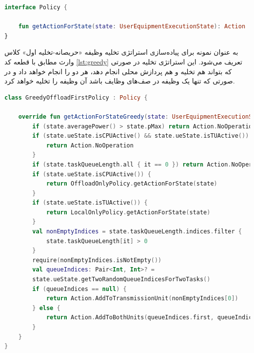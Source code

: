 \begin{LTR}
	\begin{lstlisting}[language=Kotlin, caption={واسط \lr{Policy}}, captiondirection=RTL, label={lst:policy}]
interface Policy {
	
	fun getActionForState(state: UserEquipmentExecutionState): Action
}
	\end{lstlisting}
\end{LTR}
به عنوان نمونه برای پیاده‌سازی استراتژی تخلیه وظیفه «حریصانه-تخلیه اول» کلاس وارث مطابق با قطعه کد \ref{lst:greedy} تعریف می‌شود. این استراتژی تخلیه در صورتی که بتواند هم تخلیه و هم پردازش محلی انجام دهد، هر دو را انجام خواهد داد و در صورتی که تنها یک وظیفه در صف‌های وظایف باشد آن وظیفه را تخلیه خواهد کرد.
\begin{LTR}
	\begin{lstlisting}[language=Kotlin, caption={پیاده‌سازی استراتژی تخلیه وظیفه حریصانه-تخلیه اول}, captiondirection=RTL, label={lst:greedy}]
class GreedyOffloadFirstPolicy : Policy {
	
	override fun getActionForStateGreedy(state: UserEquipmentExecutionState): Action {
		if (state.averagePower() > state.pMax) return Action.NoOperation
		if (state.ueState.isCPUActive() && state.ueState.isTUActive()) {
			return Action.NoOperation
		}
		if (state.taskQueueLength.all { it == 0 }) return Action.NoOperation
		if (state.ueState.isCPUActive()) {
			return OffloadOnlyPolicy.getActionForState(state)
		}
		if (state.ueState.isTUActive()) {
			return LocalOnlyPolicy.getActionForState(state)
		}
		val nonEmptyIndices = state.taskQueueLength.indices.filter {
			state.taskQueueLength[it] > 0
		}
		require(nonEmptyIndices.isNotEmpty())
		val queueIndices: Pair<Int, Int>? = 
		state.ueState.getTwoRandomQueueIndicesForTwoTasks()
		if (queueIndices == null) {
			return Action.AddToTransmissionUnit(nonEmptyIndices[0])
		} else {
			return Action.AddToBothUnits(queueIndices.first, queueIndices.second)
		}
	}
}
	\end{lstlisting}
\end{LTR}
